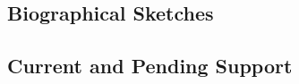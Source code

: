 \documentclass[palatinofont10]{nsfprop}
\begin{document}
\clearpage
\subsection{Biographical Sketches}
\setcounter{page}{1}

\clearpage

\clearpage


\clearpage
\vspace{-1ex}
\subsection{Current and Pending Support}
\setcounter{page}{1}

\clearpage

\clearpage

\end{document}

